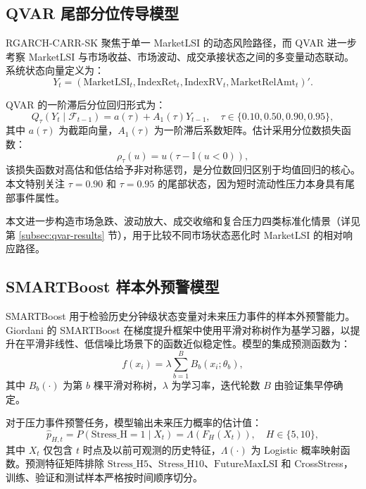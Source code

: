 \documentclass[12pt,a4paper]{ctexart}
\newcommand{\MarketLSI}{\mathrm{MarketLSI}}
\newcommand{\IndexRet}{\mathrm{IndexRet}}
\newcommand{\IndexRV}{\mathrm{IndexRV}}
\newcommand{\MarketRelAmt}{\mathrm{MarketRelAmt}}
\newcommand{\StressH}{\mathrm{Stress\_H}}
\newcommand{\StressHfive}{\mathrm{Stress\_H5}}
\newcommand{\StressHten}{\mathrm{Stress\_H10}}
\newcommand{\FutureMaxLSI}{\mathrm{FutureMaxLSI}}
\begin{document}
\subsection{QVAR 尾部分位传导模型}
\label{subsec:qvar}

RGARCH-CARR-SK 聚焦于单一 MarketLSI 的动态风险路径，而 QVAR 进一步考察 MarketLSI 与市场收益、市场波动、成交承接状态之间的多变量动态联动。系统状态向量定义为：
\begin{equation}
Y_t = (\MarketLSI_t, \IndexRet_t, \IndexRV_t, \MarketRelAmt_t)'.
\end{equation}

QVAR 的一阶滞后分位回归形式为：
\begin{equation}
Q_{\tau}(Y_t \mid \mathcal{F}_{t-1})
=a(\tau)+A_1(\tau)Y_{t-1},
\quad
\tau \in \{0.10,0.50,0.90,0.95\},
\end{equation}
其中 $a(\tau)$ 为截距向量，$A_1(\tau)$ 为一阶滞后系数矩阵。估计采用分位数损失函数：
\begin{equation}
\rho_{\tau}(u)=u\left(\tau-\mathbb{I}(u<0)\right),
\end{equation}
该损失函数对高估和低估给予非对称惩罚，是分位数回归区别于均值回归的核心。本文特别关注 $\tau=0.90$ 和 $\tau=0.95$ 的尾部状态，因为短时流动性压力本身具有尾部事件属性。

本文进一步构造市场急跌、波动放大、成交收缩和复合压力四类标准化情景（详见第 \ref{subsec:qvar-results} 节），用于比较不同市场状态恶化时 MarketLSI 的相对响应路径。

\subsection{SMARTBoost 样本外预警模型}
\label{subsec:smartboost}

SMARTBoost 用于检验历史分钟级状态变量对未来压力事件的样本外预警能力。Giordani \cite{giordani2025smartboost} 的 SMARTBoost 在梯度提升框架中使用平滑对称树作为基学习器，以提升在平滑非线性、低信噪比场景下的函数近似稳定性。模型的集成预测函数为：
\begin{equation}
f(x_i)=\lambda\sum_{b=1}^{B}B_b(x_i;\theta_b),
\end{equation}
其中 $B_b(\cdot)$ 为第 $b$ 棵平滑对称树，$\lambda$ 为学习率，迭代轮数 $B$ 由验证集早停确定。

对于压力事件预警任务，模型输出未来压力概率的估计值：
\begin{equation}
\hat{p}_{H,t}=P(\StressH=1\mid X_t)=\Lambda(F_H(X_t)),\quad H\in\{5,10\},
\end{equation}
其中 $X_t$ 仅包含 $t$ 时点及以前可观测的历史特征，$\Lambda(\cdot)$ 为 Logistic 概率映射函数。预测特征矩阵排除 $\StressHfive$、$\StressHten$、$\FutureMaxLSI$ 和 CrossStress，训练、验证和测试样本严格按时间顺序切分。
\end{document}
